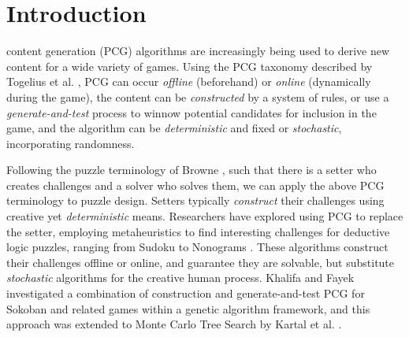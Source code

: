 \documentclass[journal]{IEEEtran}
\begin{document}
%
\maketitle


%
%
%
%
%
%
%
\IEEEdisplaynontitleabstractindextext
%
%


%
%
%
%
%
%
%
%
\IEEEpeerreviewmaketitle


\ifCLASSOPTIONcompsoc
{}
\else
\section{Introduction}
\label{sec:introduction}
\fi
%
%
%
%
%
%
%




%
%
%
%
%
%
%
%
%
%
%
%
%
%
%

 content generation (PCG) algorithms are increasingly being used to derive new content for a wide variety of games\cite{PCGSURVEY}. Using the PCG taxonomy described by Togelius et al. \cite{SBPCG}, PCG can occur {\it offline} (beforehand) or {\it online} (dynamically during the game), the content can be {\it constructed}
by a system of rules, or use a {\it generate-and-test} process to winnow potential candidates for inclusion in the game, and the algorithm can be {\it deterministic} and fixed or {\it stochastic}, incorporating randomness. 

Following the puzzle terminology of Browne \cite{PUZZLENATURE}, such that there is a setter who creates challenges and a solver who solves them, we can apply the above PCG terminology to puzzle design. Setters typically {\it construct} their challenges using creative yet {\it deterministic} means. 
Researchers have explored using PCG to replace the setter, employing metaheuristics to find interesting challenges for deductive logic puzzles, ranging from Sudoku \cite{SUDOKU} to Nonograms \cite{NONOGRAM}. These algorithms construct their challenges offline or online, and guarantee they are solvable, but substitute {\it stochastic} algorithms for the creative human process. Khalifa and Fayek\cite{PUZZLELANG} investigated a combination of construction and generate-and-test PCG for Sokoban and related games within a genetic algorithm framework, and this approach was extended to Monte Carlo Tree Search by Kartal et al. \cite{SOKOBAN}.
\end{document}
